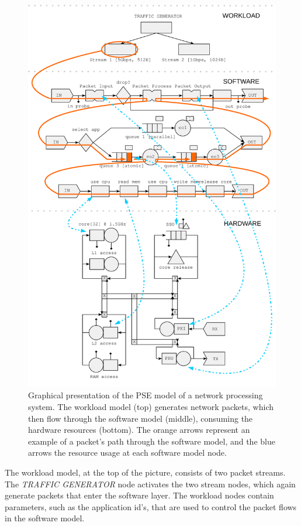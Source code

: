 \begin{figure}[]
  \begin{center}
    \includegraphics[width=\textwidth]{images/pse-models/fullmodel.pdf}
    \caption{Graphical presentation of the PSE model of a network processing system. The workload model (top) generates network packets, which then flow through the software model (middle), consuming the hardware resources (bottom). The orange arrows represent an example of a packet's path through the software model, and the blue arrows the resource usage at each software model node.}
    \label{fig:full-model}
  \end{center}
\end{figure}

The workload model, at the top of the picture, consists of two packet streams. The \emph{TRAFFIC GENERATOR} node activates the two stream nodes, which again generate packets that enter the software layer. The workload nodes contain parameters, such as the application id's, that are used to control the packet flows in the software model.

